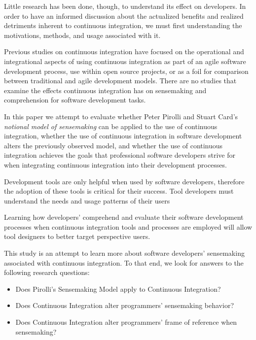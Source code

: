 \documentclass{sig-alternate}
\begin{document}
Little research has been done, though, to understand its effect on developers. In order to have an informed discussion about the actualized benefits and realized detriments inherent to continuous integration, we must first understanding the motivations, methods, and usage associated with it.

Previous studies on continuous integration have focused on the operational and integrational aspects of using continuous integration as part of an agile software development process\cite{miller:hundreddays}\cite{olsson:climbingstairway}, use within open source projects\cite{deshpande:ci_opensource}, or as a foil for comparison between traditional and agile development models\cite{staahl:modelingdiffs}. There are no studies that examine the effects continuous integration has on sensemaking and comprehension for software development tasks.

In this paper we attempt to evaluate whether Peter Pirolli and Stuart Card's \textit{notional model of sensemaking}\cite{pirolli:sensemaking} can be applied to the use of continuous integration, whether the use of continuous integration in software development alters the previously observed model, and whether the use of continuous integration achieves the goals that professional software developers strive for when integrating continuous integration into their development processes.

Development tools are only helpful when used by software developers, therefore the adoption of these tools is critical for their success. Tool developers must understand the needs and usage patterns of their users

Learning how developers' comprehend and evaluate their software development processes when continuous integration tools and processes are employed will allow tool designers to better target perspective users.

This study is an attempt to learn more about software developers' sensemaking associated with continuous integration. To that end, we look for answers to the following research questions:
\begin{itemize}
\item Does Pirolli's Sensemaking Model apply to Continuous Integration?
\item Does Continuous Integration alter programmers' sensemaking behavior?
\item Does Continuous Integration alter programmers' frame of reference when sensemaking?
\end{itemize}
\end{document}
